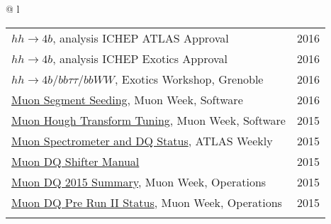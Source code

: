 \documentclass[letterpaper,11pt,oneside]{article}
\newcommand{\blue}[1]{\textcolor[rgb]{0,0,0.9}{#1}}
\begin{document}
\begin{flushleft}
\begin{tabular}{@{} l}
     \begin{tabular}{@{} l l }
     \blue{\href{https://indico.cern.ch/event/558982/contributions/2255258}{$hh\to4b$}}, analysis ICHEP ATLAS Approval & 2016\\
     \blue{\href{https://indico.cern.ch/event/556566/contributions/2244051}{$hh\to4b$}}, analysis ICHEP Exotics Approval & 2016\\
     \blue{\href{https://indico.cern.ch/event/465157/contributions/1972449}{$hh\to4b / bb\tau\tau / bbWW$}}, Exotics Workshop, Grenoble & 2016\\
      \blue{\href{https://indico.cern.ch/event/570115/contributions/2305843}{Muon Segment Seeding}}, Muon Week, Software & 2016\\
     \blue{\href{https://indico.cern.ch/event/465396/contributions/1984207}{Muon Hough Transform Tuning}}, Muon Week, Software & 2015\\
     \blue{\href{https://indico.cern.ch/event/444054/contributions/1099850}{Muon Spectrometer and DQ Status}}, ATLAS Weekly & 2015\\
     \blue{\href{https://twiki.cern.ch/twiki/pub/Atlas/MuonOfflineDQShiftInstructions/Muondq_instruction_tony_2015spring.pdf}{Muon DQ Shifter Manual}} & 2015\\
     \blue{\href{https://indico.cern.ch/event/464848/contributions/1983327}{Muon DQ 2015 Summary}}, Muon Week, Operations & 2015\\
     \blue{\href{https://indico.cern.ch/event/376175/contributions/893495}{Muon DQ Pre Run II Status}}, Muon Week, Operations & 2015\\
     \hspace{0.8\linewidth} & \hspace{0.1\linewidth} \\
      \end{tabular}
      \end{tabular}
\end{flushleft}
\end{document}
